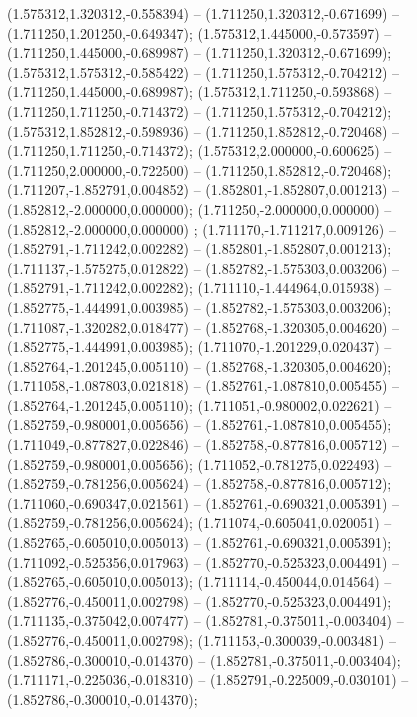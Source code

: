  (1.575312,1.320312,-0.558394) -- (1.711250,1.320312,-0.671699) -- (1.711250,1.201250,-0.649347);
 (1.575312,1.445000,-0.573597) -- (1.711250,1.445000,-0.689987) -- (1.711250,1.320312,-0.671699);
 (1.575312,1.575312,-0.585422) -- (1.711250,1.575312,-0.704212) -- (1.711250,1.445000,-0.689987);
 (1.575312,1.711250,-0.593868) -- (1.711250,1.711250,-0.714372) -- (1.711250,1.575312,-0.704212);
 (1.575312,1.852812,-0.598936) -- (1.711250,1.852812,-0.720468) -- (1.711250,1.711250,-0.714372);
 (1.575312,2.000000,-0.600625) -- (1.711250,2.000000,-0.722500) -- (1.711250,1.852812,-0.720468);
 (1.711207,-1.852791,0.004852) -- (1.852801,-1.852807,0.001213) -- (1.852812,-2.000000,0.000000);
 (1.711250,-2.000000,0.000000) -- (1.852812,-2.000000,0.000000) ;
 (1.711170,-1.711217,0.009126) -- (1.852791,-1.711242,0.002282) -- (1.852801,-1.852807,0.001213);
 (1.711137,-1.575275,0.012822) -- (1.852782,-1.575303,0.003206) -- (1.852791,-1.711242,0.002282);
 (1.711110,-1.444964,0.015938) -- (1.852775,-1.444991,0.003985) -- (1.852782,-1.575303,0.003206);
 (1.711087,-1.320282,0.018477) -- (1.852768,-1.320305,0.004620) -- (1.852775,-1.444991,0.003985);
 (1.711070,-1.201229,0.020437) -- (1.852764,-1.201245,0.005110) -- (1.852768,-1.320305,0.004620);
 (1.711058,-1.087803,0.021818) -- (1.852761,-1.087810,0.005455) -- (1.852764,-1.201245,0.005110);
 (1.711051,-0.980002,0.022621) -- (1.852759,-0.980001,0.005656) -- (1.852761,-1.087810,0.005455);
 (1.711049,-0.877827,0.022846) -- (1.852758,-0.877816,0.005712) -- (1.852759,-0.980001,0.005656);
 (1.711052,-0.781275,0.022493) -- (1.852759,-0.781256,0.005624) -- (1.852758,-0.877816,0.005712);
 (1.711060,-0.690347,0.021561) -- (1.852761,-0.690321,0.005391) -- (1.852759,-0.781256,0.005624);
 (1.711074,-0.605041,0.020051) -- (1.852765,-0.605010,0.005013) -- (1.852761,-0.690321,0.005391);
 (1.711092,-0.525356,0.017963) -- (1.852770,-0.525323,0.004491) -- (1.852765,-0.605010,0.005013);
 (1.711114,-0.450044,0.014564) -- (1.852776,-0.450011,0.002798) -- (1.852770,-0.525323,0.004491);
 (1.711135,-0.375042,0.007477) -- (1.852781,-0.375011,-0.003404) -- (1.852776,-0.450011,0.002798);
 (1.711153,-0.300039,-0.003481) -- (1.852786,-0.300010,-0.014370) -- (1.852781,-0.375011,-0.003404);
 (1.711171,-0.225036,-0.018310) -- (1.852791,-0.225009,-0.030101) -- (1.852786,-0.300010,-0.014370);
